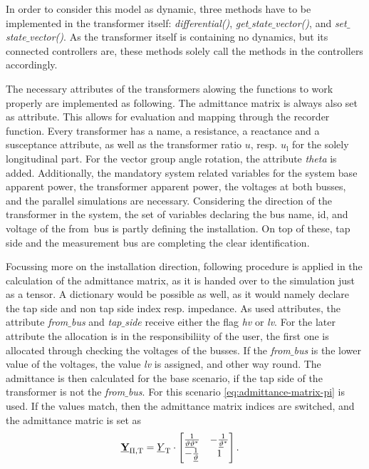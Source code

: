 In order to consider this model as dynamic, three methods have to be implemented in the transformer itself: \textit{differential()}, \textit{get$\_$state$\_$vector()}, and \textit{set$\_$state$\_$vector()}.
As the transformer itself is containing no dynamics, but its connected controllers are, these methods solely call the methods in the controllers accordingly.

The necessary attributes of the transformers alowing the functions to work properly are implemented as following.
The admittance matrix is always also set as attribute.
This allows for evaluation and mapping through the recorder function.
Every transformer has a name, a resistance, a reactance and a susceptance attribute, as well as the transformer ratio $u$, resp. $u_\mathrm{l}$ for the solely longitudinal part.
For the vector group angle rotation, the attribute \textit{theta} is added.
Additionally, the mandatory system related variables for the system base apparent power, the transformer apparent power, the voltages at both busses, and the parallel simulations are necessary.
Considering the direction of the transformer in the system, the set of variables declaring the bus name, id, and voltage of the \glqq from\grqq~bus is partly defining the installation.
On top of these, tap side and the measurement bus are completing the clear identification.

Focussing more on the installation direction, following procedure is applied in the calculation of the admittance matrix, as it is handed over to the simulation just as a tensor.
A dictionary would be possible as well, as it would namely declare the tap side and non tap side index resp. impedance.
As used attributes, the attribute \textit{from$\_$bus} and \textit{tap$\_$side} receive either the flag \textit{hv} or \textit{lv}.
For the later attribute the allocation is in the responsibiliity of the user, the first one is allocated through checking the voltages of the busses.
If the \textit{from$\_$bus} is the lower value of the voltages, the value \textit{lv} is assigned, and other way round.
The admittance is then calculated for the base scenario, if the tap side of the transformer is not the \textit{from$\_$bus}.
For this scenario \autoref{eq:admittance-matrix-pi} is used.
If the values match, then the admittance matrix indices are switched, and the admittance matric is set as
\begin{align}
        \underline{\mathrm{\textbf{Y}}}_\mathrm{\Pi,T}&=\underline{Y}_\mathrm{T} \cdot
        \begin{bmatrix}
                \frac{1}{\underline{\vartheta}\underline{\vartheta}^*} & -\frac{1}{\underline{\vartheta}^*} \\
                -\frac{1}{\underline{\vartheta}} & 1
        \end{bmatrix}. \notag
\end{align}

